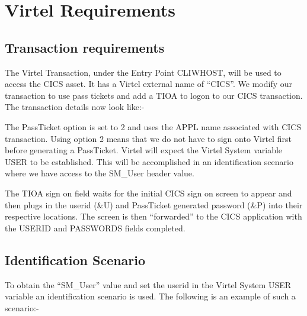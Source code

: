 \documentclass[letterpaper,10pt,english]{sphinxmanual}
\begin{document}
\newpage


\section{Virtel Requirements}
\label{\detokenize{connectivity_guide:virtel-requirements}}\label{\detokenize{connectivity_guide:index-166}}

\subsection{Transaction requirements}
\label{\detokenize{connectivity_guide:transaction-requirements}}
The Virtel Transaction, under the Entry Point CLIWHOST, will be used to access the CICS asset. It has a Virtel external name of “CICS”. We modify our transaction to use pass tickets and add a TIOA to logon to our CICS transaction. The transaction details now look like:-

 

The PassTicket option is set to 2 and uses the APPL name associated with CICS transaction. Using option 2 means that we do not have to sign onto Virtel first before generating a PassTicket. Virtel will expect the Virtel System variable USER to be established. This will be accomplished in an identification scenario where we have access to the SM\_User header value.

The TIOA sign on field waits for the initial CICS sign on screen to appear and then plugs in the userid (\&U) and PassTicket generated password (\&P) into their respective locations. The screen is then “forwarded” to the CICS application with the USERID and PASSWORDS fields completed.

\newpage


\subsection{Identification Scenario}
\label{\detokenize{connectivity_guide:identification-scenario}}
To obtain the “SM\_User” value and set the userid in the Virtel System USER variable an identification scenario is used. The following is an example of such a scenario:-
\end{document}
